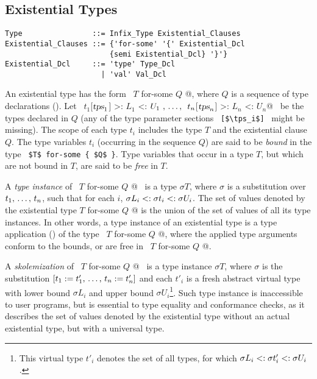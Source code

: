 \subsection{Existential Types}
\label{sec:existential-types}

\syntax\begin{lstlisting}[escapechar=@]
Type                ::= Infix_Type Existential_Clauses
Existential_Clauses ::= {'for-some' '{' Existential_Dcl
                        {semi Existential_Dcl} '}'}
Existential_Dcl     ::= 'type' Type_Dcl
                      | 'val' Val_Dcl
\end{lstlisting}

An existential type has the form ~\lstinline@$T$ for-some { $Q$ }@, where $Q$ is a sequence of type declarations (). Let ~\lstinline@$t_1$[$\mbox{\sl tps}_1$] >: $L_1$ <: $U_1\ ,\, \ldots ,\,\ t_n$[$\mbox{\sl tps}_n$] >: $L_n$ <: $U_n$@~ be the types declared in $Q$ (any of the type parameter sections ~\lstinline![$\tps_i$]!~ might be missing). The scope of each type $t_i$ includes the type $T$ and the existential clause $Q$. The type variables $t_i$ (occurring in the sequence $Q$) are said to be {\em bound} in the type ~\lstinline!$T$ for-some { $Q$ }!. Type variables that occur in a type $T$, but which are not bound in $T$, are said to be {\em free} in $T$. 

A {\em type instance} of ~\lstinline@$T$ for-some { $Q$ }@~ is a type $\sigma T$, where $\sigma$ is a substitution over $t_1 ,\, \ldots ,\, t_n$, such that for each $i$, $\sigma L_i <: \sigma t_i <: \sigma U_i$. The set of values denoted by the existential type \lstinline@$T$ for-some { $Q$ }@ is the union of the set of values of all its type instances. In other words, a type instance of an existential type is a type application () of the type ~\lstinline@$T$ for-some { $Q$ }@, where the applied type arguments conform to the bounds, or are free in ~\lstinline@$T$ for-some { $Q$ }@. 

A {\em skolemization} of ~\lstinline@$T$ for-some { $Q$ }@~ is a type instance $\sigma T$, where $\sigma$ is the substitution $[t_1 := t'_1 ,\, \ldots ,\, t_n := t'_n]$ and each $t'_i$ is a fresh abstract virtual type with lower bound $\sigma L_i$ and upper bound $\sigma U_i$\footnote{This virtual type $t'_i$ denotes the set of all types, for which $\sigma L_i <: \sigma t'_i <: \sigma U_i$.}. Such type instance is inaccessible to user programs, but is essential to type equality and conformance checks, as it describes the set of values denoted by the existential type without an actual existential type, but with a universal type. 



